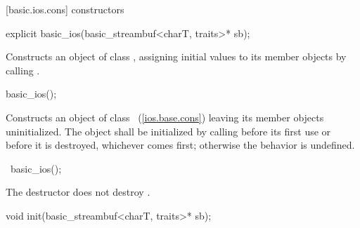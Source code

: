 [basic.ios.cons]{ constructors}

%
\begin{itemdecl}
explicit basic_ios(basic_streambuf<charT, traits>* sb);
\end{itemdecl}

\begin{itemdescr}
\pnum
\effects
Constructs an object of class
,
assigning initial values to its member objects by calling
.
\end{itemdescr}

%
\begin{itemdecl}
basic_ios();
\end{itemdecl}

\begin{itemdescr}
\pnum
\effects
Constructs an object of class
~(\ref{ios.base.cons})
leaving its member objects uninitialized. The object
shall be initialized by calling
before its first use or before it is destroyed, whichever comes first; otherwise the
behavior is undefined.
\end{itemdescr}

%
\begin{itemdecl}
~basic_ios();
\end{itemdecl}

\begin{itemdescr}
\pnum
\remarks
The destructor does not destroy
.
\end{itemdescr}

%
%
\begin{itemdecl}
void init(basic_streambuf<charT, traits>* sb);
\end{itemdecl}

